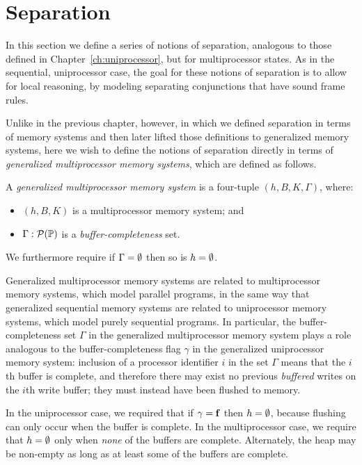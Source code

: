 \documentclass[11pt]{report}
\begin{document}
\section{Separation}
\label{sec:separation}

In this section we define a series of notions of separation, analogous to those defined in Chapter~\ref{ch:uniprocessor}, but for multiprocessor states. As in the sequential, uniprocessor case, the goal for these notions of separation is to allow for local reasoning, by modeling separating conjunctions that have sound frame rules. 

Unlike in the previous chapter, however, in which we defined separation in terms of memory systems and then later lifted those definitions to generalized memory systems, here we wish to define the notions of separation directly in terms of \emph{generalized multiprocessor memory systems}, which are defined as follows. 

\begin{definition}
  A \emph{generalized multiprocessor memory system} is a four-tuple $(h,B,K,\Gamma)$, where: 
  \begin{itemize}
    \item $(h,B,K)$ is a multiprocessor memory system; and 
    \item $\Gamma : \mathcal{P}(\mathbb{P})$ is a \emph{buffer-completeness} set. 
  \end{itemize} We furthermore require if $\Gamma = \operatorname{\emptyset}$ then so is $h = \operatorname{\emptyset}$. 
\end{definition}

Generalized multiprocessor memory systems are related to multiprocessor memory systems, which model parallel programs, in the same way that generalized sequential memory systems are related to uniprocessor memory systems, which model purely sequential programs. In particular, the buffer-completeness set $\Gamma$ in the generalized multiprocessor memory system plays a role analogous to the buffer-completeness flag $\gamma$ in the generalized uniprocessor memory system: inclusion of a processor identifier $i$ in the set $\Gamma$ means that the $i$th buffer is complete, and therefore there may exist no previous \emph{buffered} writes on the $i$th write buffer; they must instead have been flushed to memory. 

In the uniprocessor case, we required that if $\gamma = \mathbf{f}$ then $h = \operatorname{\emptyset}$, because flushing can only occur when the buffer is complete. In the multiprocessor case, we require that $h = \operatorname{\emptyset}$ only when \emph{none} of the buffers are complete. Alternately, the heap may be non-empty as long as at least some of the buffers are complete. 
\end{document}
